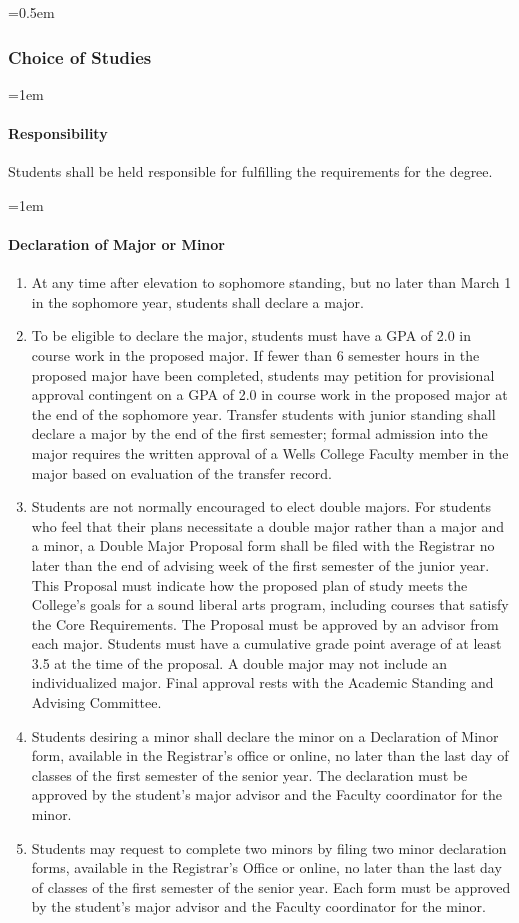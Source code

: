 \documentclass{manual}
\let\oldsubsubsection\subsubsection
\renewcommand\subsubsection{\leftskip=0.5em\oldsubsubsection}
\let\oldparagraph\paragraph
\renewcommand\paragraph{\leftskip=1em\oldparagraph}
\newcommand{\itemLevelA}{\alph*.}
\newcommand{\itemRefA}{\alph*}
\begin{document}
		\subsubsection{Choice of Studies}\label{sub:ChoiceOfStudies}

			\paragraph{Responsibility}
			Students shall be held responsible for fulfilling the requirements for the degree.

			\paragraph{Declaration of Major or Minor}

				\begin{enumerate}[label=\itemLevelA,ref=\itemRefA]
				\item At any time after elevation to sophomore standing, but no later than March 1 in the sophomore year, students shall declare a major.
				\item To be eligible to declare the major, students must have a GPA of 2.0 in course work in the proposed major. If fewer than 6 semester hours in the proposed major have been completed, students may petition for provisional approval contingent on a GPA of 2.0 in course work in the proposed major at the end of the sophomore year. Transfer students with junior standing shall declare a major by the end of the first semester; formal admission into the major requires the written approval of a Wells College Faculty member in the major based on evaluation of the transfer record.
				\item Students are not normally encouraged to elect double majors. For students who feel  that their plans necessitate a double major rather than a major and a minor,  a Double Major Proposal form shall be filed with the Registrar no later than the end of advising week of the first semester of the junior year. This Proposal must indicate how the proposed plan of study meets the College's goals for a sound liberal arts program, including courses that satisfy the Core Requirements. The Proposal must be approved by an advisor from each major. Students must have a cumulative grade point average of at least 3.5 at the time of the proposal. A double major may not include an individualized major. Final approval rests with the Academic Standing and Advising Committee.
				\item Students desiring a minor shall declare the minor on a Declaration of Minor form, available in the Registrar's office or online, no later than the last day of classes of the first semester of the senior year. The declaration must be approved by the student's major advisor and the Faculty coordinator for the minor.
				\item Students may request to complete two minors by filing two minor declaration forms, available in the Registrar's Office or online, no later than the last day of classes of the first semester of the senior year. Each form must be approved by the student's major advisor and the Faculty coordinator for the minor.
				\end{enumerate}
\end{document}

